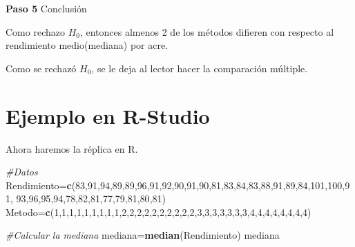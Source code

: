 \documentclass[
  a4paper,
  oneside,
  openany]{book}
\newenvironment{Shaded}{\begin{snugshade}}{\end{snugshade}}
\newcommand{\CommentTok}[1]{\textcolor[rgb]{0.56,0.35,0.01}{\textit{#1}}}
\newcommand{\DecValTok}[1]{\textcolor[rgb]{0.00,0.00,0.81}{#1}}
\newcommand{\KeywordTok}[1]{\textcolor[rgb]{0.13,0.29,0.53}{\textbf{#1}}}
\newcommand{\NormalTok}[1]{#1}
\begin{document}
\textbf{Paso 5} Conclusión

Como rechazo \(H_0\), entonces almenos 2 de los métodos difieren con respecto al rendimiento medio(mediana) por acre.

Como se rechazó \(H_0\), se le deja al lector hacer la comparación múltiple.

\hypertarget{ejemplo-en-r-studio-12}{%
\section{Ejemplo en R-Studio}\label{ejemplo-en-r-studio-12}}

Ahora haremos la réplica en R.

\begin{Shaded}
\begin{Highlighting}[]
\CommentTok{\#Datos}
\NormalTok{Rendimiento=}\KeywordTok{c}\NormalTok{(}\DecValTok{83}\NormalTok{,}\DecValTok{91}\NormalTok{,}\DecValTok{94}\NormalTok{,}\DecValTok{89}\NormalTok{,}\DecValTok{89}\NormalTok{,}\DecValTok{96}\NormalTok{,}\DecValTok{91}\NormalTok{,}\DecValTok{92}\NormalTok{,}\DecValTok{90}\NormalTok{,}\DecValTok{91}\NormalTok{,}\DecValTok{90}\NormalTok{,}\DecValTok{81}\NormalTok{,}\DecValTok{83}\NormalTok{,}\DecValTok{84}\NormalTok{,}\DecValTok{83}\NormalTok{,}\DecValTok{88}\NormalTok{,}\DecValTok{91}\NormalTok{,}\DecValTok{89}\NormalTok{,}\DecValTok{84}\NormalTok{,}\DecValTok{101}\NormalTok{,}\DecValTok{100}\NormalTok{,}\DecValTok{91}\NormalTok{,}
              \DecValTok{93}\NormalTok{,}\DecValTok{96}\NormalTok{,}\DecValTok{95}\NormalTok{,}\DecValTok{94}\NormalTok{,}\DecValTok{78}\NormalTok{,}\DecValTok{82}\NormalTok{,}\DecValTok{81}\NormalTok{,}\DecValTok{77}\NormalTok{,}\DecValTok{79}\NormalTok{,}\DecValTok{81}\NormalTok{,}\DecValTok{80}\NormalTok{,}\DecValTok{81}\NormalTok{)}
\NormalTok{Metodo=}\KeywordTok{c}\NormalTok{(}\DecValTok{1}\NormalTok{,}\DecValTok{1}\NormalTok{,}\DecValTok{1}\NormalTok{,}\DecValTok{1}\NormalTok{,}\DecValTok{1}\NormalTok{,}\DecValTok{1}\NormalTok{,}\DecValTok{1}\NormalTok{,}\DecValTok{1}\NormalTok{,}\DecValTok{1}\NormalTok{,}\DecValTok{2}\NormalTok{,}\DecValTok{2}\NormalTok{,}\DecValTok{2}\NormalTok{,}\DecValTok{2}\NormalTok{,}\DecValTok{2}\NormalTok{,}\DecValTok{2}\NormalTok{,}\DecValTok{2}\NormalTok{,}\DecValTok{2}\NormalTok{,}\DecValTok{2}\NormalTok{,}\DecValTok{2}\NormalTok{,}\DecValTok{3}\NormalTok{,}\DecValTok{3}\NormalTok{,}\DecValTok{3}\NormalTok{,}\DecValTok{3}\NormalTok{,}\DecValTok{3}\NormalTok{,}\DecValTok{3}\NormalTok{,}\DecValTok{3}\NormalTok{,}\DecValTok{4}\NormalTok{,}\DecValTok{4}\NormalTok{,}\DecValTok{4}\NormalTok{,}\DecValTok{4}\NormalTok{,}\DecValTok{4}\NormalTok{,}\DecValTok{4}\NormalTok{,}\DecValTok{4}\NormalTok{,}\DecValTok{4}\NormalTok{)}

\CommentTok{\#Calcular la mediana}
\NormalTok{mediana=}\KeywordTok{median}\NormalTok{(Rendimiento)}
\NormalTok{mediana}
\end{Highlighting}
\end{Shaded}
\end{document}
